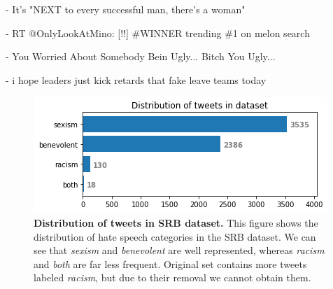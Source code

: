 \documentclass[fleqn,moreauthors,10pt]{ds_report}
\newcommand\bm{0.2pt}
\begin{document}
\begin{tcolorbox}[colback=black!8, width=0.9\linewidth, center,arc=8pt,sharp corners=downhill, boxrule=0.3pt, left=\bm, top=\bm, right=\bm, bottom=\bm, fontupper=\small]
 - It's "NEXT to every successful man, there's a woman"
\end{tcolorbox}

\begin{tcolorbox}[width=0.9\linewidth, center,arc=8pt,sharp corners=downhill, boxrule=0.3pt, left=\bm, top=\bm, right=\bm, bottom=\bm, fontupper=\small]
 - RT @OnlyLookAtMino: [!!] \#WINNER trending \#1 on melon search
\end{tcolorbox}

\begin{tcolorbox}[width=0.9\linewidth, center,arc=8pt,sharp corners=downhill, boxrule=0.3pt, left=\bm, top=\bm, right=\bm, bottom=\bm, fontupper=\small]
 - You Worried About Somebody Bein Ugly... Bitch You Ugly...
\end{tcolorbox}

\begin{tcolorbox}[width=0.9\linewidth, center,arc=8pt,sharp corners=downhill, boxrule=0.3pt, left=\bm, top=\bm, right=\bm, bottom=\bm, fontupper=\small]
 - i hope leaders just kick retards that fake leave teams today
\end{tcolorbox}

\begin{figure}[ht]\centering
	\includegraphics[width=\linewidth]{distribution_tweets_dataset1.png}
	\caption{\textbf{Distribution of tweets in SRB dataset.} This figure shows the distribution of hate speech categories in the SRB dataset. We can see that \textit{sexism} and \textit{benevolent} are well represented, whereas \textit{racism} and \textit{both} are far less frequent. Original set contains more tweets labeled \textit{racism}, but due to their removal we cannot obtain them.}
	\label{fig:distribution_tweets_dataset1}
\end{figure}
\end{document}
